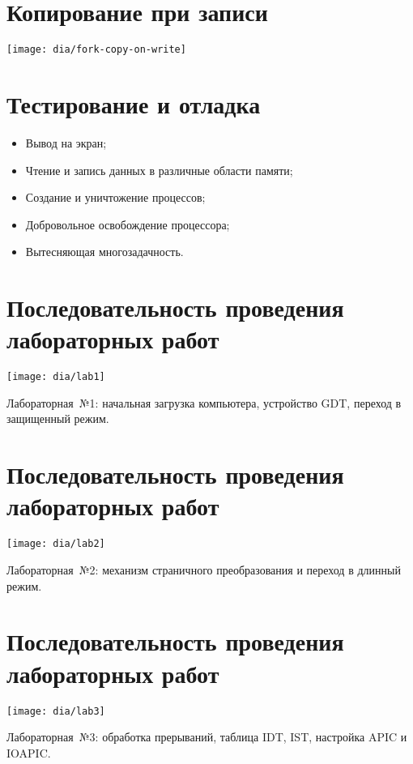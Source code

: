 \documentclass[12pt]{article}
\begin{document}
\section{\textbf{Копирование при записи}}
\texttt{[image: dia/fork-copy-on-write]}


\section{\textbf{Тестирование и отладка}}
\begin{itemize}
\item Вывод на экран;
\item Чтение и запись данных в различные области памяти;
\item Создание и уничтожение процессов;
\item Добровольное освобождение процессора;
\item Вытесняющая многозадачность.
\end{itemize}


\section{\textbf{Последовательность проведения лабораторных работ}}
\begin{center}
\texttt{[image: dia/lab1]}
\end{center}

Лабораторная~№1: начальная загрузка компьютера, устройство GDT, переход в защищенный режим.


\section{\textbf{Последовательность проведения лабораторных работ}}
\begin{center}
\texttt{[image: dia/lab2]}
\end{center}

Лабораторная~№2: механизм страничного преобразования и переход в длинный режим.

\section{\textbf{Последовательность проведения лабораторных работ}}
\begin{center}
\texttt{[image: dia/lab3]}
\end{center}

Лабораторная~№3: обработка прерываний, таблица IDT, IST, настройка APIC и IOAPIC.
\end{document}

